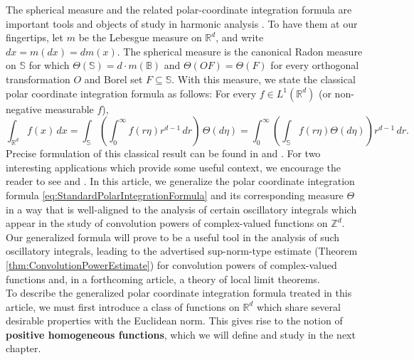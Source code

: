 \documentclass[11pt, letter]{book}
\begin{document}
\noindent The spherical measure and the related polar-coordinate integration formula are important tools and objects of study in harmonic analysis \cite{stein_harmonic_1993}. To have them at our fingertips, let $m$ be the Lebesgue measure on $\mathbb{R}^d$, and write $dx=m(dx)=dm(x)$. The spherical measure is the canonical Radon measure on $\mathbb{S}$ for which $\Theta(\mathbb{S})=d\cdot m(\mathbb{B})$ and $\Theta(OF)=\Theta(F)$ for every orthogonal transformation $O$ and Borel set $F\subseteq\mathbb{S}$. With this measure, we state the classical polar coordinate integration formula as follows: For every $f\in L^1(\mathbb{R}^d)$ (or non-negative measurable $f$),
\begin{equation}\label{eq:StandardPolarIntegrationFormula}
\int_{\mathbb{R}^d}f(x)\,dx=\int_{\mathbb{S}}\left(\int_0^\infty f(r\eta)r^{d-1}\,dr\right)\,\Theta(d\eta)=\int_0^\infty\left(\int_\mathbb{S}f(r\eta)\Theta(d\eta)\right)r^{d-1}\,dr.
\end{equation}
Precise formulation of this classical result can be found in \cite{stein_real_2009} and \cite{folland_real_2013}. For two interesting applications which provide some useful context, we encourage the reader to see \cite{baker_integration_1997} and \cite{folland_how_2001}.  In this article, we generalize the polar coordinate integration formula \eqref{eq:StandardPolarIntegrationFormula} and its corresponding measure $\Theta$ in a way that is well-aligned to the analysis of certain oscillatory integrals which appear in the study of convolution powers of complex-valued functions on $\mathbb{Z}^d$.  Our generalized formula will prove to be a useful tool in the analysis of such oscillatory integrals, leading to the advertised sup-norm-type estimate (Theorem \ref{thm:ConvolutionPowerEstimate}) for convolution powers of complex-valued functions and, in a forthcoming article, a theory of local limit theorems.\\ 

\noindent To describe the generalized polar coordinate integration formula treated in this article, we must first introduce a class of functions on $\mathbb{R}^d$ which share several desirable properties with the Euclidean norm. This gives rise to the notion of \textbf{positive homogeneous functions}, which we will define and study in the next chapter.
\end{document}
